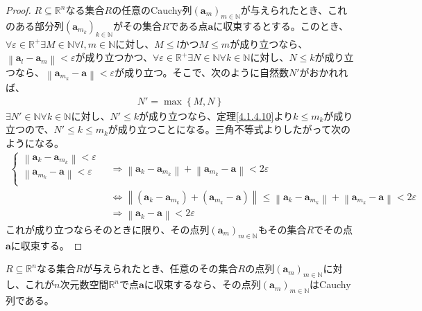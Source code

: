 \documentclass[dvipdfmx]{jsarticle}
\begin{document}
\begin{proof}
$R \subseteq \mathbb{R}^{n}$なる集合$R$の任意のCauchy列$\left( \mathbf{a}_{m} \right)_{m \in \mathbb{N}}$が与えられたとき、これのある部分列$\left( \mathbf{a}_{m_{k}} \right)_{k \in \mathbb{N}}$がその集合$R$である点$\mathbf{a}$に収束するとする。このとき、$\forall\varepsilon \in \mathbb{R}^{+}\exists M \in \mathbb{N}\forall l,m \in \mathbb{N}$に対し、$M \leq l$かつ$M \leq m$が成り立つなら、$\left\| \mathbf{a}_{l} - \mathbf{a}_{m} \right\| < \varepsilon$が成り立つかつ、$\forall\varepsilon \in \mathbb{R}^{+}\exists N \in \mathbb{N}\forall k \in \mathbb{N}$に対し、$N \leq k$が成り立つなら、$\left\| \mathbf{a}_{m_{k}} - \mathbf{a} \right\| < \varepsilon$が成り立つ。そこで、次のように自然数$N'$がおかれれば、
\begin{align*}
N' = \max\left\{ M,N \right\}
\end{align*}
$\exists N' \in \mathbb{N}\forall k \in \mathbb{N}$に対し、$N' \leq k$が成り立つなら、定理\ref{4.1.4.10}より$k \leq m_{k}$が成り立つので、$N' \leq k \leq m_{k}$が成り立つことになる。三角不等式よりしたがって次のようになる。
\begin{align*}
\left\{ \begin{matrix}
\left\| \mathbf{a}_{k} - \mathbf{a}_{m_{k}} \right\| < \varepsilon \\
\left\| \mathbf{a}_{m_{k}} - \mathbf{a} \right\| < \varepsilon \\
\end{matrix} \right.\  &\Rightarrow \left\| \mathbf{a}_{k} - \mathbf{a}_{m_{k}} \right\| + \left\| \mathbf{a}_{m_{k}} - \mathbf{a} \right\| < 2\varepsilon\\
&\Leftrightarrow \left\| \left( \mathbf{a}_{k} - \mathbf{a}_{m_{k}} \right) + \left( \mathbf{a}_{m_{k}} - \mathbf{a} \right) \right\| \leq \left\| \mathbf{a}_{k} - \mathbf{a}_{m_{k}} \right\| + \left\| \mathbf{a}_{m_{k}} - \mathbf{a} \right\| < 2\varepsilon\\
&\Rightarrow \left\| \mathbf{a}_{k} - \mathbf{a} \right\| < 2\varepsilon
\end{align*}
これが成り立つならそのときに限り、その点列$\left( \mathbf{a}_{m} \right)_{m \in \mathbb{N}}$もその集合$R$でその点$\mathbf{a}$に収束する。
\end{proof}
\begin{thm}\label{4.1.5.5}
$R \subseteq \mathbb{R}^{n}$なる集合$R$が与えられたとき、任意のその集合$R$の点列$\left( \mathbf{a}_{m} \right)_{m \in \mathbb{N}}$に対し、これが$n$次元数空間$\mathbb{R}^{n}$で点$\mathbf{a}$に収束するなら、その点列$\left( \mathbf{a}_{m} \right)_{m \in \mathbb{N}}$はCauchy列である。
\end{thm}
\end{document}
